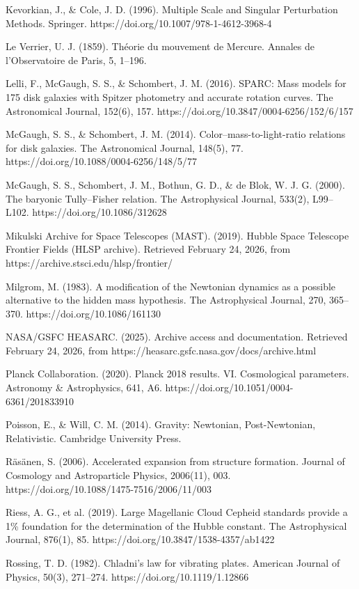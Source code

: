 Kevorkian, J., \& Cole, J. D. (1996). Multiple Scale and Singular Perturbation Methods. Springer. https://doi.org/10.1007/978-1-4612-3968-4

Le Verrier, U. J. (1859). Théorie du mouvement de Mercure. Annales de l'Observatoire de Paris, 5, 1--196.

Lelli, F., McGaugh, S. S., \& Schombert, J. M. (2016). SPARC: Mass models for 175 disk galaxies with Spitzer photometry and accurate rotation curves. The Astronomical Journal, 152(6), 157. https://doi.org/10.3847/0004-6256/152/6/157

McGaugh, S. S., \& Schombert, J. M. (2014). Color--mass-to-light-ratio relations for disk galaxies. The Astronomical Journal, 148(5), 77. https://doi.org/10.1088/0004-6256/148/5/77

McGaugh, S. S., Schombert, J. M., Bothun, G. D., \& de Blok, W. J. G. (2000). The baryonic Tully--Fisher relation. The Astrophysical Journal, 533(2), L99--L102. https://doi.org/10.1086/312628

Mikulski Archive for Space Telescopes (MAST). (2019). Hubble Space Telescope Frontier Fields (HLSP archive). Retrieved February 24, 2026, from https://archive.stsci.edu/hlsp/frontier/

Milgrom, M. (1983). A modification of the Newtonian dynamics as a possible alternative to the hidden mass hypothesis. The Astrophysical Journal, 270, 365--370. https://doi.org/10.1086/161130

NASA/GSFC HEASARC. (2025). Archive access and documentation. Retrieved February 24, 2026, from https://heasarc.gsfc.nasa.gov/docs/archive.html

Planck Collaboration. (2020). Planck 2018 results. VI. Cosmological parameters. Astronomy \& Astrophysics, 641, A6. https://doi.org/10.1051/0004-6361/201833910

Poisson, E., \& Will, C. M. (2014). Gravity: Newtonian, Post-Newtonian, Relativistic. Cambridge University Press.

Räsänen, S. (2006). Accelerated expansion from structure formation. Journal of Cosmology and Astroparticle Physics, 2006(11), 003. https://doi.org/10.1088/1475-7516/2006/11/003

Riess, A. G., et al. (2019). Large Magellanic Cloud Cepheid standards provide a 1\% foundation for the determination of the Hubble constant. The Astrophysical Journal, 876(1), 85. https://doi.org/10.3847/1538-4357/ab1422

Rossing, T. D. (1982). Chladni's law for vibrating plates. American Journal of Physics, 50(3), 271--274. https://doi.org/10.1119/1.12866

